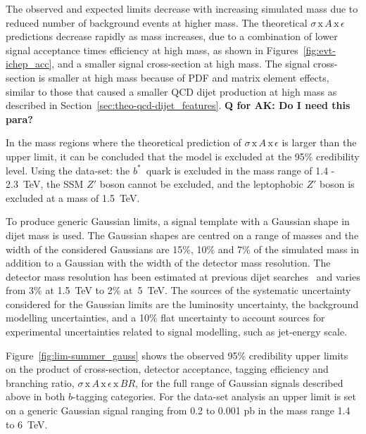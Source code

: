 The observed and expected limits decrease with increasing simulated mass
due to reduced number of background events at higher mass.
The theoretical $\sigma\,\text{x}\,\mathit{A}\,\text{x}\,\epsilon$ predictions
decrease rapidly as mass increases, due to a combination of
lower signal acceptance times efficiency at high mass, as shown in Figures~\ref{fig:evt-ichep_acc},
and a smaller signal cross-section at high mass.
The signal cross-section is smaller at high mass because of PDF and matrix element effects,
similar to those that caused a smaller QCD dijet production at high mass as described in
 Section~\ref{sec:theo-qcd-dijet_features}. \textbf{Q for AK: Do I need this para?}

In the mass regions where the theoretical prediction of $\sigma\,\text{x}\,\mathit{A}\,\text{x}\,\epsilon$
is larger than the upper limit, it can be concluded that the model is excluded at the 95\% credibility level.
Using the \summer{} data-set:
the \mbox{$b^*$ quark} is excluded in the mass range of 1.4 - 2.3~TeV,
the SSM $Z'$ boson cannot be excluded,
and the leptophobic $Z'$ boson is excluded at a mass of 1.5~TeV.

To produce generic Gaussian limits,
a signal template with a Gaussian shape in dijet mass is used.
The Gaussian shapes are centred on a range of masses
and the width of the considered Gaussians are
15\%, 10\% and 7\% of the simulated mass
in addition to a Gaussian with the width of the detector mass resolution.
The detector mass resolution has been estimated
at previous dijet searches~\cite{dijet-mori16_paper}
and varies from 3\% at 1.5~TeV to 2\% at~5~TeV.
The sources of the systematic uncertainty considered for the Gaussian limits 
are the luminosity uncertainty,
the background modelling uncertainties,
and a 10\% flat uncertainty to account sources for
experimental uncertainties related to signal modelling,
such as jet-energy scale.

Figure~\ref{fig:lim-summer_gauss} shows the observed 95\% credibility upper limits
on the product of cross-section, detector acceptance, tagging efficiency and branching ratio,
$\sigma\,\text{x}\,\mathit{A}\,\text{x}\,\epsilon\,\text{x}\,\mathit{BR}$,
for the full range of Gaussian signals described above in both $b$-tagging categories.
For the \summer{} data-set analysis an upper limit is set on a generic Gaussian signal
ranging from 0.2 to 0.001 pb in the mass range 1.4 to 6~TeV.

